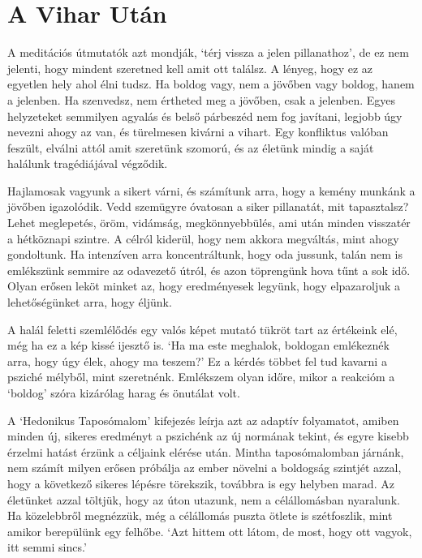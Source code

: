 \clearpage

\section{A Vihar Után}


\noindent A meditációs útmutatók azt mondják, `térj vissza a jelen
pillanathoz', de ez nem jelenti, hogy mindent szeretned kell amit ott
találsz. A lényeg, hogy ez az egyetlen hely ahol élni tudsz. Ha boldog
vagy, nem a jövőben vagy boldog, hanem a jelenben. Ha szenvedsz, nem
értheted meg a jövőben, csak a jelenben. Egyes helyzeteket semmilyen
agyalás és belső párbeszéd nem fog javítani, legjobb úgy nevezni ahogy
az van, és türelmesen kivárni a vihart. Egy konfliktus valóban feszült,
elválni attól amit szeretünk szomorú, és az életünk mindig a saját
halálunk tragédiájával végződik.

Hajlamosak vagyunk a sikert várni, és számítunk arra, hogy a kemény
munkánk a jövőben igazolódik. Vedd szemügyre óvatosan a siker
pillanatát, mit tapasztalsz? Lehet meglepetés, öröm, vidámság,
megkönnyebbülés, ami után minden visszatér a hétköznapi szintre. A
célról kiderül, hogy nem akkora megváltás, mint ahogy gondoltunk. Ha
intenzíven arra koncentráltunk, hogy oda jussunk, talán nem is
emlékszünk semmire az odavezető útról, és azon töprengünk hova tűnt a
sok idő. Olyan erősen leköt minket az, hogy eredményesek legyünk, hogy
elpazaroljuk a lehetőségünket arra, hogy éljünk.


A halál feletti szemlélődés egy valós képet mutató tükröt tart az
értékeink elé, még ha ez a kép kissé ijesztő is. `Ha ma este meghalok,
boldogan emlékeznék arra, hogy úgy élek, ahogy ma teszem?' Ez a kérdés
többet fel tud kavarni a psziché mélyből, mint szeretnénk. Emlékszem
olyan időre, mikor a reakcióm a `boldog' szóra kizárólag harag és
önutálat volt.

A `Hedonikus Taposómalom' kifejezés leírja azt az adaptív folyamatot,
amiben minden új, sikeres eredményt a pszichénk az új normának tekint,
és egyre kisebb érzelmi hatást érzünk a céljaink elérése után. Mintha
taposómalomban járnánk, nem számít milyen erősen próbálja az ember
növelni a boldogság szintjét azzal, hogy a következő sikeres lépésre
törekszik, továbbra is egy helyben marad. Az életünket azzal töltjük,
hogy az úton utazunk, nem a célállomásban nyaralunk. Ha közelebbről
megnézzük, még a célállomás puszta ötlete is szétfoszlik, mint amikor
berepülünk egy felhőbe. `Azt hittem ott látom, de most, hogy ott vagyok,
itt semmi sincs.'

